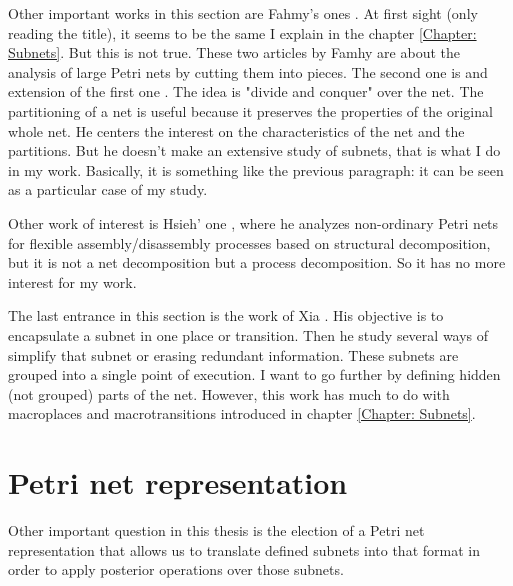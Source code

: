 Other important works in this section are Fahmy's ones \cite{SN-Fahmy1990321,SN-Fahmy1993127}.
At first sight (only reading the title), it seems to be the same I explain in the chapter \ref{Chapter: Subnets}. But
this is not true. These two articles by Famhy are about the analysis of large Petri nets by cutting them into pieces. The second one \cite{SN-Fahmy1993127} is and extension of the first one \cite{SN-Fahmy1990321}. The idea is "divide
and conquer" over the net. The partitioning of a net is useful because it preserves the properties of the original whole net. He centers the interest
on the characteristics of the net and the partitions. But he doesn't make an extensive study of subnets, that is what I do in my work. Basically, it is something like the previous paragraph: it can be seen as a particular case of my study. 

Other work of interest is Hsieh' one \cite{G-PROP-Hsieh2011496}, where he
analyzes non-ordinary Petri nets for flexible assembly/disassembly processes
based on structural decomposition, but it is not a net decomposition but a process decomposition. So it has no more interest for my work. 

The last entrance in this section is the work of Xia \cite{R-Xia20111662}. His objective is to encapsulate a subnet
in one place or transition. Then he study several ways of simplify that subnet
or erasing
redundant information. These subnets are grouped into a single point of execution. I want to go further by defining hidden (not grouped) parts of the net. However, this work  has much to do with macroplaces and macrotransitions  introduced in chapter \ref{Chapter: Subnets}.
\section{Petri net representation}

Other important question in this thesis is the election of a Petri net representation
that allows us to translate defined subnets into that format in order to
apply posterior operations over those subnets.

